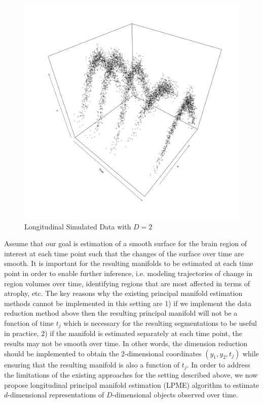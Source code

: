\documentclass[11pt,reqno]{article}
\renewcommand{\textwidth}{180mm}
\theoremstyle{definition}
\begin{document}
\begin{figure}[h]
  \centering
  \includegraphics[width=\textwidth]{sim_case1_plot2}
  \caption{Longitudinal Simulated Data with $D = 2$}
  \label{fig:sample_data}
\end{figure}

Assume that our goal is estimation of a smooth surface for the brain region of interest at each time point such that the changes of the surface over time are smooth. It is important for the resulting manifolds to be estimated at each time point in order to enable further inference, i.e. modeling trajectories of change in region volumes over time, identifying regions that are most affected in terms of atrophy, etc. The key reasons why the existing principal manifold estimation methods cannot be implemented in this setting are 1) if we implement the data reduction method above then the resulting principal manifold will not be a function of time $t_j$ which is necessary for the resulting segmentations to be useful in practice, 2) if the manifold is estimated separately at each time point, the results may not be smooth over time. In other words, the dimension reduction should be implemented to obtain the 2-dimensional coordinates $(y_1,y_2,t_j)$ while ensuring that the resulting manifold is also a function of $t_j$. In order to address the limitations of the existing approaches for the setting described above, we now propose longitudinal principal manifold estimation (LPME) algorithm to estimate $d$-dimensional representations of $D$-dimensional objects observed over time. 
\end{document}
